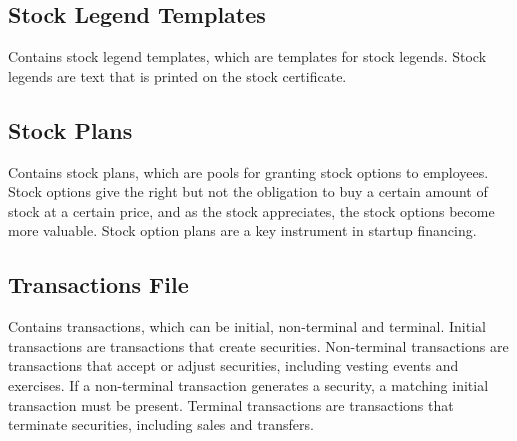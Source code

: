 \subsection{Stock Legend Templates}

Contains stock legend templates, which are templates for stock legends. Stock legends are text that is printed on the stock certificate.

\subsection{Stock Plans}

Contains stock plans, which are pools for granting stock options to employees. Stock options give the right but not the obligation to buy a certain amount of stock at a certain price, and as the stock appreciates, the stock options become more valuable. Stock option plans are a key instrument in startup financing.

\subsection{Transactions File}

Contains transactions, which can be initial, non-terminal and terminal. Initial transactions are transactions that create securities. Non-terminal transactions are transactions that accept or adjust securities, including vesting events and exercises. If a non-terminal transaction generates a security, a matching initial transaction must be present. Terminal transactions are transactions that terminate securities, including sales and transfers.

